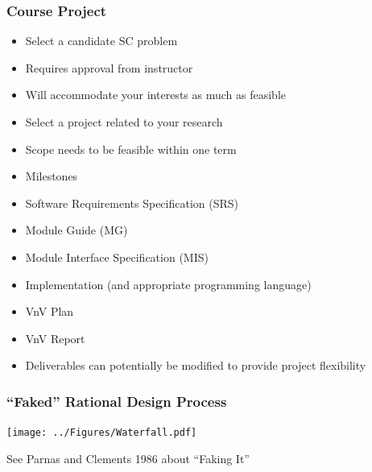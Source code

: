 \documentclass[t,12pt,numbers,fleqn]{beamer}
\begin{document}

\begin{frame}
\frametitle{Course Project}

\begin {itemize}

\item Select a candidate SC problem
\bi
\item Requires approval from instructor
\item Will accommodate your interests as much as feasible
\item Select a project related to your research
\item Scope needs to be feasible within one term
\ei
\item Milestones
\be
\item Software Requirements Specification (SRS)
\item Module Guide (MG)
\item Module Interface Specification (MIS)
\item Implementation (and appropriate programming language)
\item VnV Plan
\item VnV Report
\ee
\item Deliverables can potentially be modified to provide project flexibility
\end {itemize}

\end{frame}


\begin{frame}

\frametitle{``Faked'' Rational Design Process}

\begin{center}
\texttt{[image: ../Figures/Waterfall.pdf]}
\end{center}

See Parnas and Clements 1986 about ``Faking It''

\end{frame}

\end{document}
